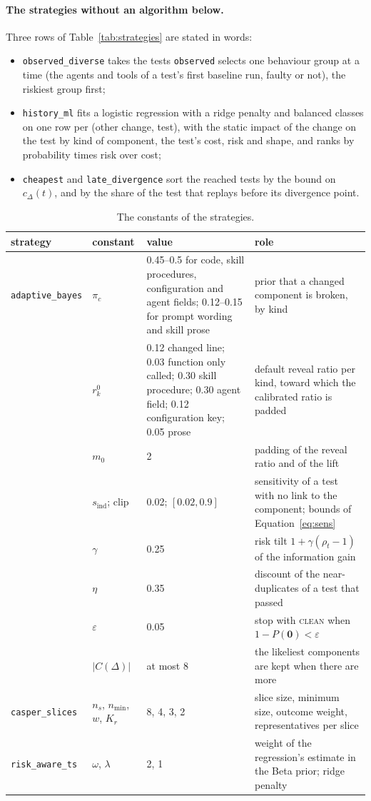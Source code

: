 \documentclass[11pt,a4paper]{article}
\newcommand{\strat}[1]{\texttt{#1}}
\newcommand{\clean}{\textsc{clean}}
\begin{document}
\paragraph{The strategies without an algorithm below.} Three rows of Table~\ref{tab:strategies} are stated in
words:
\begin{itemize}
  \item \strat{observed\_diverse} takes the tests \strat{observed} selects one behaviour group at a time (the
        agents and tools of a test's first baseline run, faulty or not), the riskiest group first;
  \item \strat{history\_ml} fits a logistic regression with a ridge penalty and balanced classes on one row per
        (other change, test), with the static impact of the change on the test by kind of component, the test's
        cost, risk and shape, and ranks by probability times risk over cost;
  \item \strat{cheapest} and \strat{late\_divergence} sort the reached tests by the bound on $c_\Delta(t)$, and
        by the share of the test that replays before its divergence point.
\end{itemize}

\begin{table}[H]
\centering\small
\caption{The constants of the strategies.}
\label{tab:constants}
\setlength{\tabcolsep}{4pt}
\begin{tabular}{lp{22mm}p{50mm}p{49mm}}
\toprule
strategy & constant & value & role \\
\midrule
\strat{adaptive\_bayes} & $\pi_c$ & 0.45--0.5 for code, skill procedures, configuration and agent fields; 0.12--0.15 for prompt wording and skill prose & prior that a changed component is broken, by kind \\
& $r^0_k$ & 0.12 changed line; 0.03 function only called; 0.30 skill procedure; 0.30 agent field; 0.12 configuration key; 0.05 prose & default reveal ratio per kind, toward which the calibrated ratio is padded \\
& $m_0$ & 2 & padding of the reveal ratio and of the lift \\
& $s_{\mathrm{ind}}$; clip & 0.02; $[0.02, 0.9]$ & sensitivity of a test with no link to the component; bounds of Equation~\ref{eq:sens} \\
& $\gamma$ & 0.25 & risk tilt $1 + \gamma(\rho_t - 1)$ of the information gain \\
& $\eta$ & 0.35 & discount of the near-duplicates of a test that passed \\
& $\varepsilon$ & 0.05 & stop with \clean{} when $1 - P(\mathbf{0}) < \varepsilon$ \\
& $|C(\Delta)|$ & at most 8 & the likeliest components are kept when there are more \\
\strat{casper\_slices} & $n_s$, $n_{\min}$, $w$, $K_r$ & 8, 4, 3, 2 & slice size, minimum size, outcome weight, representatives per slice \\
\strat{risk\_aware\_ts} & $\omega$, $\lambda$ & 2, 1 & weight of the regression's estimate in the Beta prior; ridge penalty \\
\bottomrule
\end{tabular}
\end{table}
\end{document}
